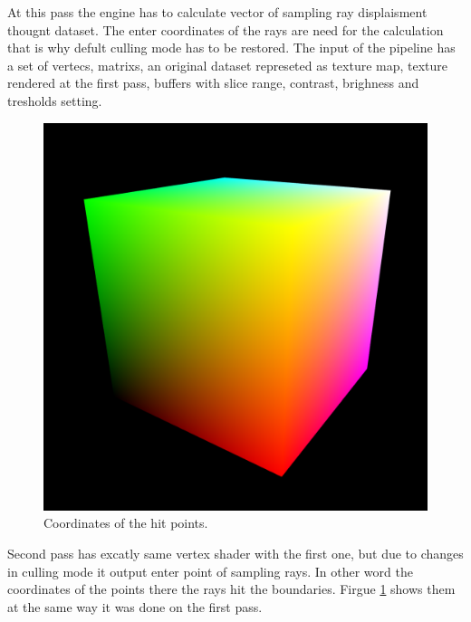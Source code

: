 \documentclass[twoside, english, 11pt]{report}
\begin{document}
At this pass the engine has to calculate vector of sampling ray displaisment thougnt dataset. The enter coordinates of the rays are need for the calculation that is why defult culling mode has to be restored. The input of the pipeline has a set of vertecs, matrixs, an original dataset represeted as texture map, texture rendered at the first pass, buffers with slice range, contrast, brighness and tresholds setting.\\
\begin{figure}[!h]
\centerline{\includegraphics[scale = 0.5]{img/second}}
\caption{Coordinates of the hit points.\label{fig:second}}
\end{figure}

Second pass has excatly same vertex shader with the first one, but due to changes in culling mode it output enter point of sampling rays. In other word the coordinates of the points there the rays hit the boundaries. Firgue \ref{fig:second} shows them at the same way it was done on the first pass.\\
\end{document}
